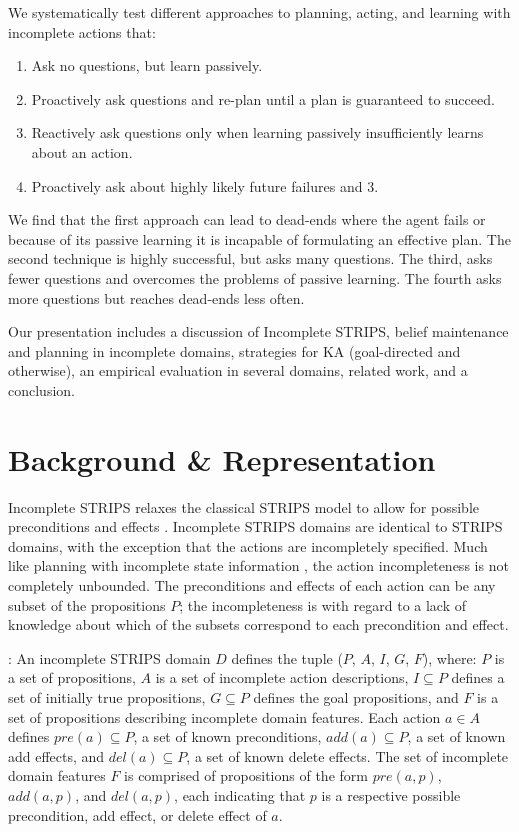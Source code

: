 \documentclass[letterpaper]{article}
\def\und#1{\noindent{\bf #1}:}
\def\citep#1{\cite{#1}}
\begin{document}
We systematically test different approaches to planning, acting, and learning
with incomplete actions that:
\begin{enumerate}
\item Ask no questions, but learn passively. 
\item Proactively ask questions and re-plan until a plan is guaranteed to
succeed.
\item Reactively ask questions only when learning passively insufficiently
learns about an action.
\item  Proactively ask about
highly likely future failures and 3.
\end{enumerate}
We find that the first approach can lead to dead-ends where the agent fails or
because of its passive learning it is incapable of formulating an effective
plan.  The second technique is highly successful, but asks many questions.  The
third, asks fewer questions and overcomes the problems of passive learning.  The
fourth asks more questions but reaches
dead-ends less often.

Our presentation includes a discussion of Incomplete STRIPS, belief maintenance
and planning in incomplete domains, strategies for KA
(goal-directed and otherwise), an empirical evaluation in several domains,
related work, and a conclusion.

\section{Background \& Representation}\label{sec:background}

Incomplete STRIPS relaxes the classical STRIPS model to allow for
possible preconditions and effects \citep{Garland02}.  
Incomplete STRIPS domains are identical to STRIPS domains, with the exception
that the actions are incompletely specified.  Much like planning with incomplete
state information \citep{bonet00planning}, the action incompleteness is not
completely unbounded.  The preconditions and effects of each action can be any
subset of the propositions $P$; the incompleteness is with regard to a lack of
knowledge about which of the subsets correspond to each precondition and effect.        

\und{Incomplete STRIPS Domains} An incomplete STRIPS domain ${D}$  defines the
tuple ($P$, ${A}$, $I$, $G$, $F$), where: $P$ is a  set of propositions, ${A}$
is a set of incomplete  action descriptions, $I \subseteq P$ defines a set of
initially true  propositions, $G \subseteq P$ defines the goal propositions, and
$F$ is a set of propositions describing incomplete domain features. Each action
${a} \in {A}$ defines $pre({a}) \subseteq P$, a set of known preconditions,
$add({a}) \subseteq P$, a set of known add  effects, and $del({a}) \subseteq P$,
a set of known delete effects.   The set of incomplete domain features $F$ is
comprised of propositions of the form $pre({a}, p)$, $add({a}, p)$, and
$del({a}, p)$, each indicating that $p$ is a respective possible precondition, add effect, or
delete effect of $a$.
\end{document}
